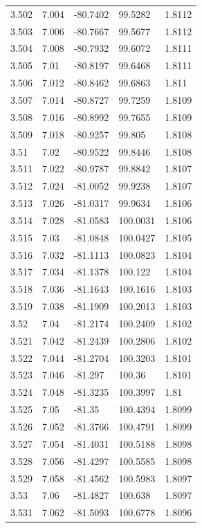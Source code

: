 \begin{tabular}{lllll}
3.502 & 7.004 & -80.7402 & 99.5282 & 1.8112 \\
3.503 & 7.006 & -80.7667 & 99.5677 & 1.8112 \\
3.504 & 7.008 & -80.7932 & 99.6072 & 1.8111 \\
3.505 & 7.01 & -80.8197 & 99.6468 & 1.8111 \\
3.506 & 7.012 & -80.8462 & 99.6863 & 1.811 \\
3.507 & 7.014 & -80.8727 & 99.7259 & 1.8109 \\
3.508 & 7.016 & -80.8992 & 99.7655 & 1.8109 \\
3.509 & 7.018 & -80.9257 & 99.805 & 1.8108 \\
3.51 & 7.02 & -80.9522 & 99.8446 & 1.8108 \\
3.511 & 7.022 & -80.9787 & 99.8842 & 1.8107 \\
3.512 & 7.024 & -81.0052 & 99.9238 & 1.8107 \\
3.513 & 7.026 & -81.0317 & 99.9634 & 1.8106 \\
3.514 & 7.028 & -81.0583 & 100.0031 & 1.8106 \\
3.515 & 7.03 & -81.0848 & 100.0427 & 1.8105 \\
3.516 & 7.032 & -81.1113 & 100.0823 & 1.8104 \\
3.517 & 7.034 & -81.1378 & 100.122 & 1.8104 \\
3.518 & 7.036 & -81.1643 & 100.1616 & 1.8103 \\
3.519 & 7.038 & -81.1909 & 100.2013 & 1.8103 \\
3.52 & 7.04 & -81.2174 & 100.2409 & 1.8102 \\
3.521 & 7.042 & -81.2439 & 100.2806 & 1.8102 \\
3.522 & 7.044 & -81.2704 & 100.3203 & 1.8101 \\
3.523 & 7.046 & -81.297 & 100.36 & 1.8101 \\
3.524 & 7.048 & -81.3235 & 100.3997 & 1.81 \\
3.525 & 7.05 & -81.35 & 100.4394 & 1.8099 \\
3.526 & 7.052 & -81.3766 & 100.4791 & 1.8099 \\
3.527 & 7.054 & -81.4031 & 100.5188 & 1.8098 \\
3.528 & 7.056 & -81.4297 & 100.5585 & 1.8098 \\
3.529 & 7.058 & -81.4562 & 100.5983 & 1.8097 \\
3.53 & 7.06 & -81.4827 & 100.638 & 1.8097 \\
3.531 & 7.062 & -81.5093 & 100.6778 & 1.8096 \\

\end{tabular}
